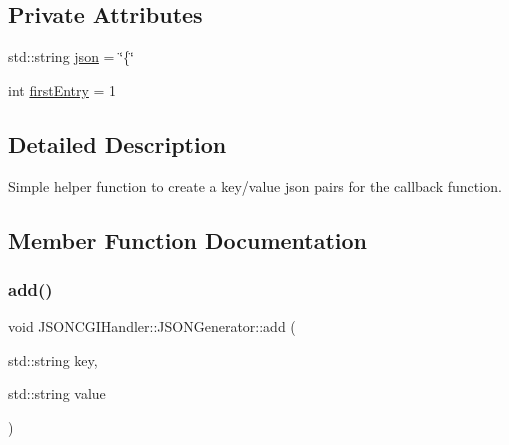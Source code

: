 \subsection*{Private Attributes}
\begin{DoxyCompactItemize}
\item 
std\+::string \hyperlink{classJSONCGIHandler_1_1JSONGenerator_a5a9fd42e7b9030c6a0a4bee923a2e416}{json} = \char`\"{}\{\char`\"{}
\item 
int \hyperlink{classJSONCGIHandler_1_1JSONGenerator_a9d14c80af92fa9f3a3406d826acd2cc0}{first\+Entry} = 1
\end{DoxyCompactItemize}


\subsection{Detailed Description}
Simple helper function to create a key/value json pairs for the callback function. 

\subsection{Member Function Documentation}
\mbox{\label{classJSONCGIHandler_1_1JSONGenerator_a191efd00967cbace0d9ddfedea39cd9b}} 
\subsubsection{\texorpdfstring{add()}{add()}\hspace{0.1cm}{\footnotesize\ttfamily [1/5]}}
{\footnotesize\ttfamily void J\+S\+O\+N\+C\+G\+I\+Handler\+::\+J\+S\+O\+N\+Generator\+::add (\begin{DoxyParamCaption}\item[{std\+::string}]{key,  }\item[{std\+::string}]{value }\end{DoxyParamCaption})\hspace{0.3cm}{\ttfamily [inline]}}

